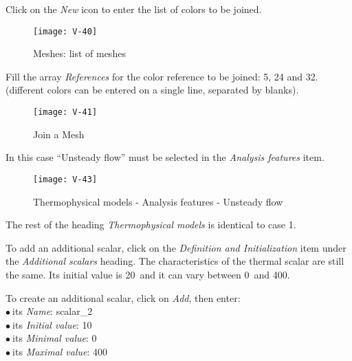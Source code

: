 Click on the {\itshape New} icon to enter the list of colors to be joined.

\begin{figure}[h!]
\begin{center}
\texttt{[image: V-40]}
\caption{Meshes: list of meshes}
\label{fig2_e2}
\end{center}
\end{figure}


\newpage
Fill the array
{\itshape References} for the color reference to be joined: 5, 24 and 32.
(different colors can be entered on a single line, separated by blanks).

\begin{figure}[h!]
\begin{center}
\texttt{[image: V-41]}
\caption{Join a Mesh}
\label{fig5_e2}
\end{center}
\end{figure}


\newpage
In this case ``Unsteady flow'' must be selected in the
{\itshape Analysis features} item.

\begin{figure}[h!]
\begin{center}
\texttt{[image: V-43]}
\caption{Thermophysical models - Analysis features - Unsteady flow}
\label{fig6_e2}
\end{center}
\end{figure}

The rest of the heading {\itshape Thermophysical models} is identical to case
1.


\newpage
To add an additional scalar, click on the
{\itshape Definition and Initialization} item under the
{\itshape Additional scalars} heading.
The characteristics of the thermal scalar are still the
same. Its initial value is 20\degresC\ and it can vary between
0\degresC\ and 400\degresC.

To create an additional scalar, click on {\itshape Add}, then enter:\\
\hspace*{1cm}$\bullet\ $its {\itshape Name}: scalar\_2\\
\hspace*{1cm}$\bullet\ $its {\itshape Initial value}: 10\\
\hspace*{1cm}$\bullet\ $its {\itshape Minimal value}: 0\\
\hspace*{1cm}$\bullet\ $its {\itshape Maximal value}: 400


